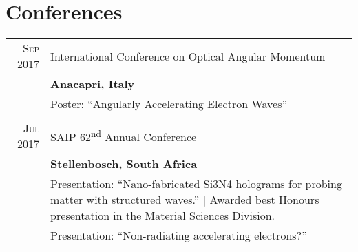 \section{Conferences}

\begin{tabular}{rp{12cm}}
	\textsc{Sep} 2017 & International Conference on Optical Angular Momentum \\
	& \textbf{Anacapri, Italy} \\
	& \small{Poster: ``Angularly Accelerating Electron Waves''} \\
	& \\
	\textsc{Jul} 2017 & SAIP 62\textsuperscript{nd} Annual Conference \\
	& \textbf{Stellenbosch, South Africa} \\
	& \small{Presentation: ``Nano-fabricated Si3N4 holograms for probing matter with structured waves.'' | Awarded best Honours presentation in the Material Sciences Division.} \\
	& \small{Presentation: ``Non-radiating accelerating electrons?''}
\end{tabular}